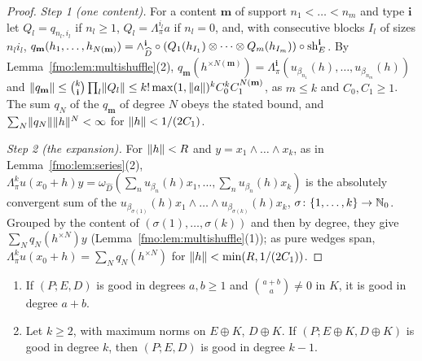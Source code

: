 \begin{proof}
\emph{Step 1 (one content).} For a content $\mathbf m$ of support $n_1<\dots<n_m$ and type $\mathbf i$ let
$Q_l=q_{n_l,i_l}$ if $n_l\ge1$, $Q_l=\Lambda^{i_l}_\pi a$ if $n_l=0$, and, with consecutive blocks $I_l$ of sizes $n_li_l$,
$q_{\mathbf m}(h_1,\dots,h_{N(\mathbf m)})=\wedge^{\mathbf i}_{\widehat D}\circ(Q_1(h_{I_1})\otimes\dots\otimes Q_m(h_{I_m}))
\circ\operatorname{sh}^{\mathbf i}_E$. By Lemma~\ref{fmo:lem:multishuffle}(2), $q_{\mathbf m}(h^{\times N(\mathbf m)})=\Lambda^{\mathbf i}_\pi
(u_{\beta_{n_1}}(h),\dots,u_{\beta_{n_m}}(h))$ and $\lVert q_{\mathbf m}\rVert\le\binom k{\mathbf i}\prod_l\lVert Q_l\rVert\le
k!\max(1,\lVert a\rVert)^kC_0^kC_1^{N(\mathbf m)}$, as $m\le k$ and $C_0,C_1\ge1$. The sum $q_N$ of the $q_{\mathbf m}$ of degree
$N$ obeys the stated bound, and $\sum_N\lVert q_N\rVert\lVert h\rVert^N<\infty$ for $\lVert h\rVert<1/(2C_1)$.

\emph{Step 2 (the expansion).} For $\lVert h\rVert<R$ and $y=x_1\wedge\dots\wedge x_k$, as in Lemma~\ref{fmo:lem:series}(2),
$\Lambda^k_\pi u(x_0+h)y=\omega_{\widehat D}(\sum_nu_{\beta_n}(h)x_1,\dots,\sum_nu_{\beta_n}(h)x_k)$ is the absolutely
convergent sum of the $u_{\beta_{\sigma(1)}}(h)x_1\wedge\dots\wedge u_{\beta_{\sigma(k)}}(h)x_k$, $\sigma\colon\{1,\dots,k\}
\to\mathbb N_0$. Grouped by the content of $(\sigma(1),\dots,\sigma(k))$ and then by degree, they give $\sum_Nq_N(h^{\times N})y$
(Lemma~\ref{fmo:lem:multishuffle}(1)); as pure wedges span, $\Lambda^k_\pi u(x_0+h)=\sum_Nq_N(h^{\times N})$ for
$\lVert h\rVert<\min(R,1/(2C_1))$.
\end{proof}

\begin{lemma}\label{fmo:lem:steps}
\begin{enumerate}
\item If $(P;E,D)$ is good in degrees $a,b\ge1$ and $\binom{a+b}a\ne0$ in $K$, it is good in degree $a+b$.
\item Let $k\ge2$, with maximum norms on $E\oplus K$, $D\oplus K$. If $(P;E\oplus K,D\oplus K)$ is good in degree $k$, then
$(P;E,D)$ is good in degree $k-1$.
\end{enumerate}
\end{lemma}

